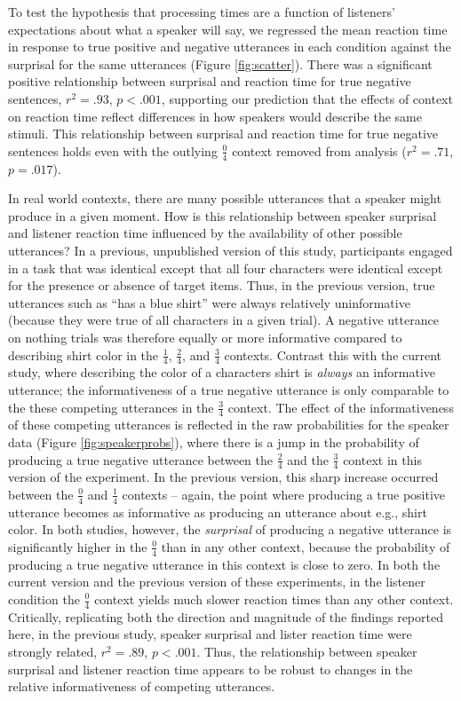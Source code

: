 \documentclass[man, noapacite]{apa2}
\begin{document}
To test the hypothesis that processing times are a function of listeners' expectations about what a speaker will say, we regressed the mean reaction time in response to true positive and negative utterances in each condition against the surprisal for the same utterances (Figure \ref{fig:scatter}).  There was a significant positive relationship between surprisal and reaction time for true negative sentences, $r^2=.93$, $p<.001$, supporting our prediction that the effects of context on reaction time reflect differences in how speakers would describe the same stimuli. This relationship between surprisal and reaction time for true negative sentences holds even with the outlying $\frac{0}{4}$ context removed from analysis ($r^2=.71$, $p = .017$).

In real world contexts, there are many possible utterances that a speaker might produce in a given moment. How is this relationship between speaker surprisal and listener reaction time influenced by the availability of other possible utterances? In a previous, unpublished version of this study, participants engaged in a task that was identical except that all four characters were identical except for the presence or absence of target items. Thus, in the previous version, true utterances such as ``has a blue shirt'' were always relatively uninformative (because they were true of all characters in a given trial). A negative utterance on nothing trials was therefore equally or more informative compared to describing shirt color in the $\frac{1}{4}$, $\frac{2}{4}$, and $\frac{3}{4}$ contexts. Contrast this with the current study, where describing the color of a characters shirt is \emph{always} an informative utterance; the informativeness of a true negative utterance is only comparable to the these competing utterances in the $\frac{3}{4}$ context. The effect of the informativeness of these competing utterances is reflected in the raw probabilities for the speaker data (Figure \ref{fig:speakerprobs}), where there is a jump in the probability of producing a true negative utterance between the $\frac{2}{4}$ and the $\frac{3}{4}$ context in this version of the experiment. In the previous version, this sharp increase occurred between the $\frac{0}{4}$ and $\frac{1}{4}$ contexts -- again, the point where producing a true positive utterance becomes as informative as producing an utterance about e.g., shirt color. In both studies, however, the \emph{surprisal} of producing a negative utterance is significantly higher in the $\frac{0}{4}$ than in any other context, because the probability of producing a true negative utterance in this context is close to zero. In both the current version and the previous version of these experiments, in the listener condition the $\frac{0}{4}$ context yields much slower reaction times than any other context. Critically, replicating both the direction and magnitude of the findings reported here, in the previous study, speaker surprisal and lister reaction time were strongly related, $r^2=.89$, $p<.001$. Thus, the relationship between speaker surprisal and listener reaction time appears to be robust to changes in the relative informativeness of competing utterances. 
\end{document}
